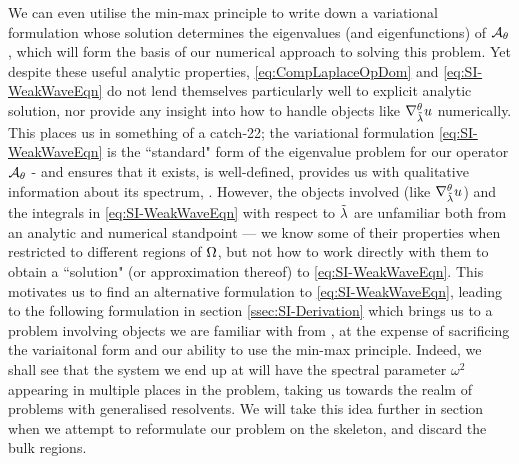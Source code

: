 We can even utilise the min-max principle to write down a variational formulation whose solution determines the eigenvalues (and eigenfunctions) of $\mathcal{A}_{\theta}$, which will form the basis of our numerical approach to solving this problem.
Yet despite these useful analytic properties, \eqref{eq:CompLaplaceOpDom} and \eqref{eq:SI-WeakWaveEqn} do not lend themselves particularly well to explicit analytic solution, nor provide any insight into how to handle objects like $\nabla^{\theta}_{\tilde{\lambda}}u$ numerically.
This places us in something of a catch-22; the variational formulation \eqref{eq:SI-WeakWaveEqn} is the ``standard" form of the eigenvalue problem for our operator $\mathcal{A}_{\theta}$ - and ensures that it exists, is well-defined, provides us with qualitative information about its spectrum, .
However, the objects involved (like $\nabla^{\theta}_{\tilde{\lambda}}u$) and the integrals in \eqref{eq:SI-WeakWaveEqn} with respect to $\tilde{\lambda}$ are unfamiliar both from an analytic and numerical standpoint --- we know some of their properties when restricted to different regions of $\Omega$, but not how to work directly with them to obtain a ``solution" (or approximation thereof) to \eqref{eq:SI-WeakWaveEqn}.
This motivates us to find an alternative formulation to \eqref{eq:SI-WeakWaveEqn}, leading to the following  formulation in section \ref{ssec:SI-Derivation} which brings us to a problem involving objects we are familiar with from , at the expense of sacrificing the variaitonal form and our ability to use the min-max principle.
Indeed, we shall see that the system we end up at will have the spectral parameter $\omega^2$ appearing in multiple places in the problem, taking us towards the realm of problems with generalised resolvents.
We will take this idea further in section  when we attempt to reformulate our problem on the skeleton, and discard the bulk regions.

